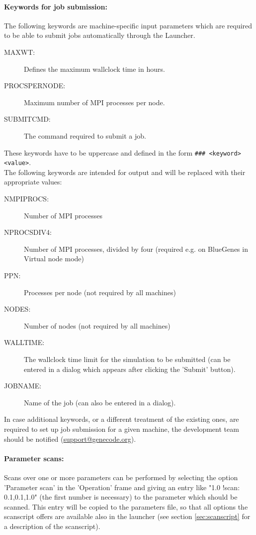 \documentclass[12pt]{article}
\begin{document}
\paragraph{Keywords for job submission:}
The following keywords are machine-specific input parameters which are required to be able to submit
jobs automatically through the Launcher.
\begin{description}
  \item[MAXWT:] Defines the maximum wallclock time in hours.
  \item[PROCSPERNODE:] Maximum number of MPI processes per node.
  \item[SUBMITCMD:] The command required to submit a job.
 \end{description}
These keywords have to be uppercase and defined in the form \texttt{\#\#\#~<keyword> <value>}.\\
The following keywords are intended for output and will be replaced with their appropriate values:
\begin{description}
  \item[NMPIPROCS:] Number of MPI processes
  \item[NPROCSDIV4:] Number of MPI processes, divided by four (required e.g. on BlueGenes in Virtual
    node mode)
  \item[PPN:] Processes per node (not required by all machines)
  \item[NODES:] Number of nodes (not required by all machines)
  \item[WALLTIME:] The wallclock time limit for the simulation to be submitted (can be entered in a
    dialog which appears after clicking the 'Submit' button).
  \item[JOBNAME:] Name of the job (can also be entered in a dialog).
\end{description}
In case additional keywords, or a different treatment of the existing ones, are required to set up
job submission for a given machine, the \gene development team should be notified (\href{mailto:support@genecode.org}{support@genecode.org}).

\paragraph{Parameter scans:}
Scans over one or more parameters can be performed by selecting the option 'Parameter scan' in the
'Operation' frame and giving an entry like "1.0 !scan: 0.1,0.1,1.0" (the first number is necessary)
to the parameter which should be scanned.
This entry will be copied to the parameters file, so that all options the scanscript offers are
available also in the launcher (see section \ref{sec:scanscript} for a description of the scanscript).
\end{document}
